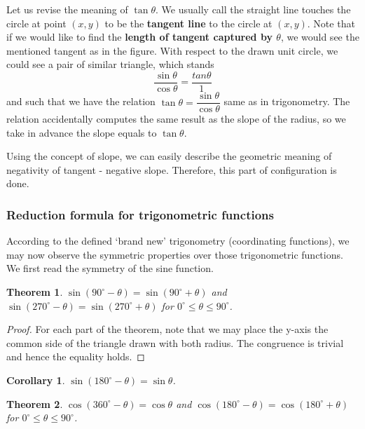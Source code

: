 \documentclass[12pt]{article}
\newtheorem*{theorem}{Theorem}
\newtheorem*{corollary}{Corollary}
\begin{document}
    Let us revise the meaning of $\tan{\theta}$. We usually call the straight line touches the circle at point $(x,y)$ to be the \textbf{tangent line} to the circle at $(x,y)$. Note that if we would like to find the \textbf{length of tangent captured by $\theta$}, we would see the mentioned tangent as in the figure. With respect to the drawn unit circle, we could see a pair of similar triangle, which stands $$\frac{\sin{\theta}}{\cos{\theta}}=\frac{tan{\theta}}{1}$$ and such that we have the relation $\tan{\theta}=\dfrac{\sin{\theta}}{\cos{\theta}}$ same as in trigonometry. The relation accidentally computes the same result as the slope of the radius, so we take in advance the slope equals to $\tan{\theta}$.

    Using the concept of slope, we can easily describe the geometric meaning of negativity of tangent - negative slope. Therefore, this part of configuration is done.

    \subsubsection*{Reduction formula for trigonometric functions}

    According to the defined `brand new' trigonometry (coordinating functions), we may now observe the symmetric properties over those trigonometric functions. We first read the symmetry of the sine function.

    \begin{theorem}
        $\sin{(90^\circ - \theta)}=\sin{(90^\circ + \theta)}$ and $\sin{(270^\circ - \theta)}=\sin{(270^\circ + \theta)}$ for $0^\circ \leq \theta \leq 90^\circ$.
    \end{theorem}

    \begin{proof}
        For each part of the theorem, note that we may place the y-axis the common side of the triangle drawn with both radius. The congruence is trivial and hence the equality holds.
    \end{proof}

    \begin{corollary}
        $\sin{(180^\circ - \theta)}=\sin{\theta}$.
    \end{corollary}

    \begin{theorem}
        $\cos{(360^\circ - \theta)}=\cos{\theta}$ and $\cos{(180^\circ - \theta)}=\cos{(180^\circ + \theta)}$ for $0^\circ \leq \theta \leq 90^\circ$.
    \end{theorem}
\end{document}
